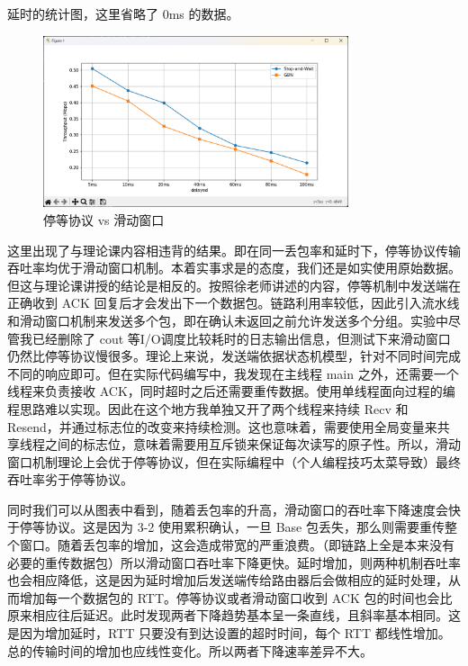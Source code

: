 \documentclass[UTF8,a4paper,10pt]{ctexart}
\begin{document}
延时的统计图，这里省略了 0ms 的数据。
\begin{figure}[H]
    \centering
\includegraphics[width=0.8\textwidth]{img/p1-2.png}
    \caption{停等协议 vs 滑动窗口}
\end{figure}
这里出现了与理论课内容相违背的结果。即在同一丢包率和延时下，停等协议传输吞吐率均优于滑动窗口机制。本着实事求是的态度，我们还是如实使用原始数据。但这与理论课讲授的结论是相反的。按照徐老师讲述的内容，停等机制中发送端在正确收到 ACK 回复后才会发出下一个数据包。链路利用率较低，因此引入流水线和滑动窗口机制来发送多个包，即在确认未返回之前允许发送多个分组。实验中尽管我已经删除了 cout 等I/O调度比较耗时的日志输出信息，但测试下来滑动窗口仍然比停等协议慢很多。理论上来说，发送端依据状态机模型，针对不同时间完成不同的响应即可。但在实际代码编写中，我发现在主线程 main 之外，还需要一个线程来负责接收 ACK，同时超时之后还需要重传数据。使用单线程面向过程的编程思路难以实现。因此在这个地方我单独又开了两个线程来持续 Recv 和 Resend，并通过标志位的改变来持续检测。这也意味着，需要使用全局变量来共享线程之间的标志位，意味着需要用互斥锁来保证每次读写的原子性。所以，滑动窗口机制理论上会优于停等协议，但在实际编程中（个人编程技巧太菜导致）最终吞吐率劣于停等协议。\par
同时我们可以从图表中看到，随着丢包率的升高，滑动窗口的吞吐率下降速度会快于停等协议。这是因为 3-2 使用累积确认，一旦 Base 包丢失，那么则需要重传整个窗口。随着丢包率的增加，这会造成带宽的严重浪费。（即链路上全是本来没有必要的重传数据包）所以滑动窗口吞吐率下降更快。延时增加，则两种机制吞吐率也会相应降低，这是因为延时增加后发送端传给路由器后会做相应的延时处理，从而增加每一个数据包的 RTT。停等协议或者滑动窗口收到 ACK 包的时间也会比原来相应往后延迟。此时发现两者下降趋势基本呈一条直线，且斜率基本相同。这是因为增加延时，RTT 只要没有到达设置的超时时间，每个 RTT 都线性增加。总的传输时间的增加也应线性变化。所以两者下降速率差异不大。
\end{document}
